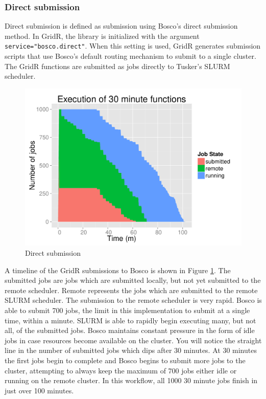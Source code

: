 \subsubsection{Direct submission}
Direct submission is defined as submission using Bosco's direct submission method.  In GridR, the library is initialized with the argument \texttt{service="bosco.direct"}.  When this setting is used, GridR generates submission scripts that use Bosco's default routing mechanism to submit to a single cluster.  The GridR functions are submitted as jobs directly to Tusker's SLURM scheduler.

\begin{figure}[h!t]
\centering
\includegraphics[width=\textwidth]{BoscoRImages/30minplot.pdf}

\caption{Direct submission}
\label{fig:directsubmit}
\end{figure}

A timeline of the GridR submissions to Bosco is shown in Figure \ref{fig:directsubmit}.  The submitted jobs are jobs which are submitted locally, but not yet submitted to the remote scheduler.  Remote represents the jobs which are submitted to the remote SLURM scheduler.  The submission to the remote scheduler is very rapid.  Bosco is able to submit 700 jobs, the limit in this implementation to submit at a single time, within a minute.  SLURM is able to rapidly begin executing many, but not all, of the submitted jobs.  Bosco maintains constant pressure in the form of idle jobs in case resources become available on the cluster.  You will notice the straight line in the number of submitted jobs which dips after 30 minutes.  At 30 minutes the first jobs begin to complete and Bosco begins to submit more jobs to the cluster, attempting to always keep the maximum of 700 jobs either idle or running on the remote cluster.  In this workflow, all 1000 30 minute jobs finish in just over 100 minutes.


